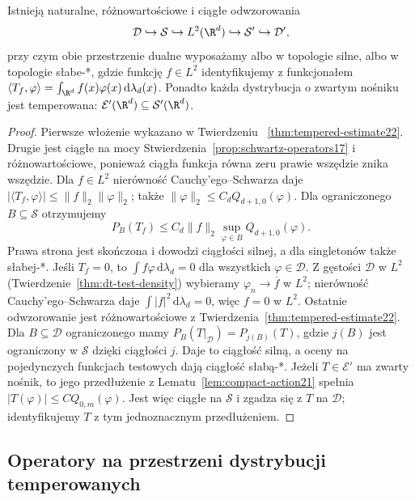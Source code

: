 \begin{stwierdzenie}
\label{prop:schwartz-embeddings22}
Istnieją naturalne, różnowartościowe i ciągłe odwzorowania
\[
 \mathcal D\hookrightarrow\mathcal S\hookrightarrow
 L^2(\R^d)\hookrightarrow\mathcal S'\hookrightarrow\mathcal D',
\]
przy czym obie przestrzenie dualne wyposażamy albo
w topologie silne, albo w topologie słabe-*,
gdzie funkcję $f\in L^2$ identyfikujemy z funkcjonałem
$\langle T_f,\varphi\rangle=\int_{\R^d}f(x)\varphi(x)
\,\mathrm d\lambda_d(x)$.
Ponadto każda dystrybucja o zwartym nośniku jest temperowana:
$\mathcal E'(\R^d)\subseteq\mathcal S'(\R^d)$.
\end{stwierdzenie}
\begin{proof}
Pierwsze włożenie wykazano w Twierdzeniu~
\ref{thm:tempered-estimate22}. Drugie jest ciągłe na mocy
Stwierdzenia~\ref{prop:schwartz-operators17} i różnowartościowe,
ponieważ ciągła funkcja równa zeru prawie wszędzie znika
wszędzie. Dla $f\in L^2$ nierówność Cauchy'ego--Schwarza daje
$|\langle T_f,\varphi\rangle|\le\|f\|_2\|\varphi\|_2$;
także $\|\varphi\|_2\le C_dQ_{d+1,0}(\varphi)$.
Dla ograniczonego $B\subseteq\mathcal S$ otrzymujemy
\[
 P_B(T_f)\le C_d\|f\|_2\sup_{\varphi\in B}Q_{d+1,0}(\varphi).
\]
Prawa strona jest skończona i dowodzi ciągłości silnej,
a dla singletonów także słabej-*.
Jeśli $T_f=0$, to $\int f\varphi\,\mathrm d\lambda_d=0$
dla wszystkich $\varphi\in\mathcal D$.
Z gęstości $\mathcal D$ w $L^2$
(Twierdzenie~\ref{thm:dt-test-density}) wybieramy $\varphi_n\to
\overline f$ w $L^2$; nierówność Cauchy'ego--Schwarza daje
$\int |f|^2\,\mathrm d\lambda_d=0$, więc $f=0$ w $L^2$.
Ostatnie odwzorowanie jest różnowartościowe z
Twierdzenia~\ref{thm:tempered-estimate22}. Dla
$B\subseteq\mathcal D$ ograniczonego mamy
$P_B(T|_{\mathcal D})=P_{j(B)}(T)$, gdzie $j(B)$ jest
ograniczony w $\mathcal S$ dzięki ciągłości $j$.
Daje to ciągłość silną, a oceny na pojedynczych
funkcjach testowych dają ciągłość słabą-*.
Jeżeli $T\in\mathcal E'$ ma zwarty nośnik,
to jego przedłużenie z Lematu~\ref{lem:compact-action21}
spełnia $|T(\varphi)|\le C Q_{0,m}(\varphi)$.
Jest więc ciągłe na $\mathcal S$ i zgadza się z $T$
na $\mathcal D$; identyfikujemy $T$ z tym jednoznacznym
przedłużeniem.
\end{proof}

\subsection{Operatory na przestrzeni dystrybucji temperowanych}

